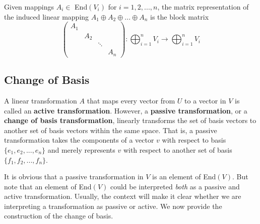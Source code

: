   \begin{theorem}
    Given mappings $A_i \in$ End$(V_i)$ for $i = 1, 2, ..., n$, the matrix representation of the induced linear mapping $A_1 \oplus A_2 \oplus ... \oplus A_n$ is the block matrix 
    \begin{equation}
      \begin{pmatrix}
      A_1 & & & \\
      & A_2 & & \\
      & & \ddots & \\
      & & & A_n
      \end{pmatrix}: \bigoplus_{i=1}^n V_i \longrightarrow \bigoplus_{i=1}^n V_i
    \end{equation}
  \end{theorem}

\subsection{Change of Basis}

  \begin{definition}
    A linear transformation $A$ that maps every vector from $U$ to a vector in $V$ is called an \textbf{active transformation}. However, a \textbf{passive transformation}, or a \textbf{change of basis transformation}, linearly transforms the set of basis vectors to another set of basis vectors within the same space. That is, a passive transformation takes the components of a vector $v$ with respect to basis $\{e_1, e_2, ..., e_n\}$ and merely represents $v$ with respect to another set of basis $\{f_1, f_2, ..., f_n\}$. 
  \end{definition}

  It is obvious that a passive transformation in $V$ is an element of End$(V)$. But note that an element of End$(V)$ could be interpreted \textit{both} as a passive and active transformation. Usually, the context will make it clear whether we are interpreting a transformation as passive or active. We now provide the construction of the change of basis. 


